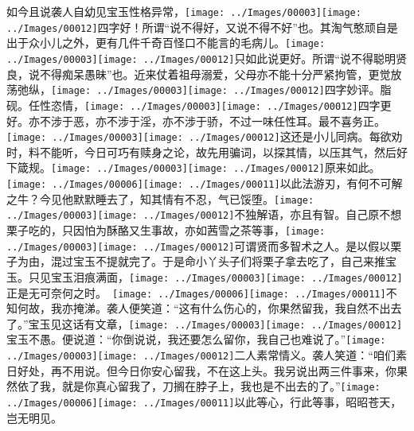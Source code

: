 如今且说袭人自幼见宝玉性格异常，{\texttt{[image: ../Images/00003]}\texttt{[image: ../Images/00012]}\footnotesize \kaishu 四字好！所谓``说不得好，又说不得不好''也。}其淘气憨顽自是出于众小儿之外，更有几件千奇百怪口不能言的毛病儿。{\texttt{[image: ../Images/00003]}\texttt{[image: ../Images/00012]}\footnotesize \kaishu 只如此说更好。所谓``说不得聪明贤良，说不得痴呆愚昧''也。}近来仗着祖母溺爱，父母亦不能十分严紧拘管，更觉放荡弛纵，{\texttt{[image: ../Images/00003]}\texttt{[image: ../Images/00012]}\footnotesize \kaishu 四字妙评。脂砚。}任性恣情，{\texttt{[image: ../Images/00003]}\texttt{[image: ../Images/00012]}\footnotesize \kaishu 四字更好。亦不涉于恶，亦不涉于淫，亦不涉于骄，不过一味任性耳。}最不喜务正。{\texttt{[image: ../Images/00003]}\texttt{[image: ../Images/00012]}\footnotesize \kaishu 这还是小儿同病。}每欲劝时，料不能听，今日可巧有赎身之论，故先用骗词，以探其情，以压其气，然后好下箴规。{\texttt{[image: ../Images/00003]}\texttt{[image: ../Images/00012]}\footnotesize \kaishu 原来如此。　\texttt{[image: ../Images/00006]}\texttt{[image: ../Images/00011]}\footnotesize \kaishu 以此法游刃，有何不可解之牛？}今见他默默睡去了，知其情有不忍，气已馁堕。{\texttt{[image: ../Images/00003]}\texttt{[image: ../Images/00012]}\footnotesize \kaishu 不独解语，亦且有智。}自己原不想栗子吃的，只因怕为酥酪又生事故，亦如茜雪之茶等事，{\texttt{[image: ../Images/00003]}\texttt{[image: ../Images/00012]}\footnotesize \kaishu 可谓贤而多智术之人。}是以假以栗子为由，混过宝玉不提就完了。于是命小丫头子们将栗子拿去吃了，自己来推宝玉。只见宝玉泪痕满面，{\texttt{[image: ../Images/00003]}\texttt{[image: ../Images/00012]}\footnotesize \kaishu 正是无可奈何之时。　\texttt{[image: ../Images/00006]}\texttt{[image: ../Images/00011]}\footnotesize \kaishu 不知何故，我亦掩涕。}袭人便笑道：``这有什么伤心的，你果然留我，我自然不出去了。''宝玉见这话有文章，{\texttt{[image: ../Images/00003]}\texttt{[image: ../Images/00012]}\footnotesize \kaishu 宝玉不愚。}便说道：``你倒说说，我还要怎么留你，我自己也难说了。''{\texttt{[image: ../Images/00003]}\texttt{[image: ../Images/00012]}\footnotesize \kaishu 二人素常情义。}袭人笑道：``咱们素日好处，再不用说。但今日你安心留我，不在这上头。我另说出两三件事来，你果然依了我，就是你真心留我了，刀搁在脖子上，我也是不出去的了。''{\texttt{[image: ../Images/00006]}\texttt{[image: ../Images/00011]}\footnotesize \kaishu 以此等心，行此等事，昭昭苍天，岂无明见。}

